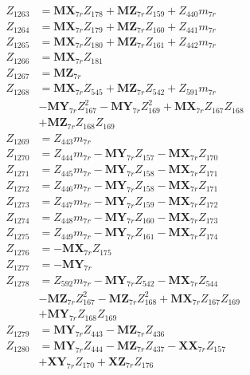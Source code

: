 \begin{multicols}{2}
\begin{align}
Z_{1263} &= \mathbf{MX}_{7r}Z_{178} + \mathbf{MZ}_{7r}Z_{159} + Z_{440}m_{7r} \nonumber \\
Z_{1264} &= \mathbf{MX}_{7r}Z_{179} + \mathbf{MZ}_{7r}Z_{160} + Z_{441}m_{7r} \nonumber \\
Z_{1265} &= \mathbf{MX}_{7r}Z_{180} + \mathbf{MZ}_{7r}Z_{161} + Z_{442}m_{7r} \nonumber \\
Z_{1266} &= \mathbf{MX}_{7r}Z_{181} \nonumber \\
Z_{1267} &= \mathbf{MZ}_{7r} \nonumber \\
Z_{1268} &= \mathbf{MX}_{7r}Z_{545} + \mathbf{MZ}_{7r}Z_{542} + Z_{591}m_{7r}  \nonumber \\
&- \mathbf{MY}_{7r}Z_{167}^2 - \mathbf{MY}_{7r}Z_{169}^2 + \mathbf{MX}_{7r}Z_{167}Z_{168}  \nonumber \\
&+ \mathbf{MZ}_{7r}Z_{168}Z_{169} \nonumber \\
Z_{1269} &= Z_{443}m_{7r} \nonumber \\
Z_{1270} &= Z_{444}m_{7r} - \mathbf{MY}_{7r}Z_{157} - \mathbf{MX}_{7r}Z_{170} \nonumber \\
Z_{1271} &= Z_{445}m_{7r} - \mathbf{MY}_{7r}Z_{158} - \mathbf{MX}_{7r}Z_{171} \nonumber \\
Z_{1272} &= Z_{446}m_{7r} - \mathbf{MY}_{7r}Z_{158} - \mathbf{MX}_{7r}Z_{171} \nonumber \\
Z_{1273} &= Z_{447}m_{7r} - \mathbf{MY}_{7r}Z_{159} - \mathbf{MX}_{7r}Z_{172} \nonumber \\
Z_{1274} &= Z_{448}m_{7r} - \mathbf{MY}_{7r}Z_{160} - \mathbf{MX}_{7r}Z_{173} \nonumber \\
Z_{1275} &= Z_{449}m_{7r} - \mathbf{MY}_{7r}Z_{161} - \mathbf{MX}_{7r}Z_{174} \nonumber \\
Z_{1276} &= -\mathbf{MX}_{7r}Z_{175} \nonumber \\
Z_{1277} &= -\mathbf{MY}_{7r} \nonumber \\
Z_{1278} &= Z_{592}m_{7r} - \mathbf{MY}_{7r}Z_{542} - \mathbf{MX}_{7r}Z_{544}  \nonumber \\
&- \mathbf{MZ}_{7r}Z_{167}^2 - \mathbf{MZ}_{7r}Z_{168}^2 + \mathbf{MX}_{7r}Z_{167}Z_{169}  \nonumber \\
&+ \mathbf{MY}_{7r}Z_{168}Z_{169} \nonumber \\
Z_{1279} &= \mathbf{MY}_{7r}Z_{443} - \mathbf{MZ}_{7r}Z_{436} \nonumber \\
Z_{1280} &= \mathbf{MY}_{7r}Z_{444} - \mathbf{MZ}_{7r}Z_{437} - \mathbf{XX}_{7r}Z_{157}  \nonumber \\
&+ \mathbf{XY}_{7r}Z_{170} + \mathbf{XZ}_{7r}Z_{176} \nonumber \\

\end{align}
\end{multicols}

